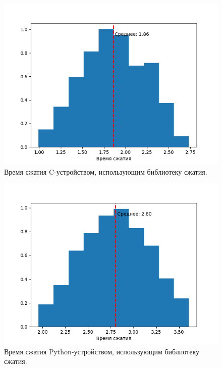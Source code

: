 \begin{figure}[!htbp]
    \centering
    \begin{adjustbox}{max totalsize={0.8\textwidth}{\textheight}}
        \includegraphics{images/hist-lib-c-dev.png}
    \end{adjustbox}
    \caption{Время сжатия C-устройством, использующим библиотеку сжатия.}\label{fig:hist-lib-c-dev}
\end{figure}


\begin{figure}[!htbp]
    \centering
    \begin{adjustbox}{max totalsize={0.8\textwidth}{\textheight}}
        \includegraphics{images/hist-lib-py-dev.png}
    \end{adjustbox}
    \caption{Время сжатия Python-устройством, использующим библиотеку сжатия.}\label{fig:hist-lib-py-dev}
\end{figure}

